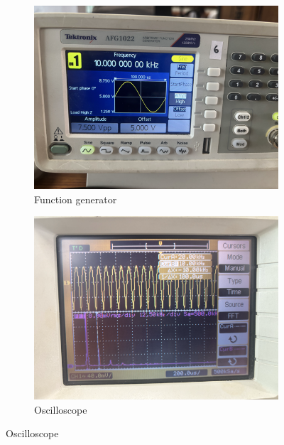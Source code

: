 \documentclass[12pt,a4paper]{article}
\begin{document}
\pagebreak
\begin{figure}[h!]
\centering
\begin{subfigure}[b]{0.47\linewidth}
    \centering
    \includegraphics[width=\textwidth]{Experiment_5/figs/FFT_gen_2.png}
    \caption{Function generator}
\end{subfigure}
\begin{subfigure}[b]{0.48\linewidth}
    \centering
    \includegraphics[width=\textwidth]{Experiment_5/figs/FFT_osc_2.png}
    \caption{Oscilloscope}
\end{subfigure}
\end{figure}
\end{document}
